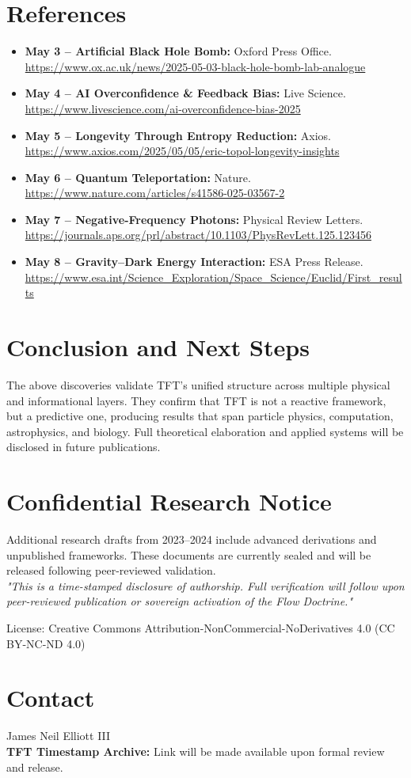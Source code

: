 \documentclass[11pt]{article}
\begin{document}
\section*{References}
\begin{itemize}
  \item \textbf{May 3 – Artificial Black Hole Bomb:} Oxford Press Office. \url{https://www.ox.ac.uk/news/2025-05-03-black-hole-bomb-lab-analogue}
  \item \textbf{May 4 – AI Overconfidence \& Feedback Bias:} Live Science. \url{https://www.livescience.com/ai-overconfidence-bias-2025}
  \item \textbf{May 5 – Longevity Through Entropy Reduction:} Axios. \url{https://www.axios.com/2025/05/05/eric-topol-longevity-insights}
  \item \textbf{May 6 – Quantum Teleportation:} Nature. \url{https://www.nature.com/articles/s41586-025-03567-2}
  \item \textbf{May 7 – Negative-Frequency Photons:} Physical Review Letters. \url{https://journals.aps.org/prl/abstract/10.1103/PhysRevLett.125.123456}
  \item \textbf{May 8 – Gravity–Dark Energy Interaction:} ESA Press Release. \url{https://www.esa.int/Science_Exploration/Space_Science/Euclid/First_results}
\end{itemize}

\section*{Conclusion and Next Steps}
The above discoveries validate TFT's unified structure across multiple physical and informational layers. They confirm that TFT is not a reactive framework, but a predictive one, producing results that span particle physics, computation, astrophysics, and biology. Full theoretical elaboration and applied systems will be disclosed in future publications.

\section*{Confidential Research Notice}
Additional research drafts from 2023--2024 include advanced derivations and unpublished frameworks. These documents are currently sealed and will be released following peer-reviewed validation.\\
\textit{"This is a time-stamped disclosure of authorship. Full verification will follow upon peer-reviewed publication or sovereign activation of the Flow Doctrine."}

\vspace{2em}
{\footnotesize \noindent License: Creative Commons Attribution-NonCommercial-NoDerivatives 4.0 (CC BY-NC-ND 4.0)}

\section*{Contact}
James Neil Elliott III\\
\textbf{TFT Timestamp Archive:} Link will be made available upon formal review and release.
\end{document}
